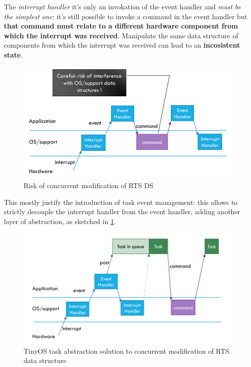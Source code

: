 \documentclass[10pt,a4paper]{report}
\theoremstyle{definition}
\begin{document}
The \textit{interrupt handler} it's only an invokation of the event handler and \textit{must be the simplest one}: it's still possible to invoke a command in the event handler but \textbf{that command must relate to a different hardware component from which the interrupt was received}. Manipulate the same data structure of components from which the interrupt was received can lead to an \textbf{incosistent state}.
\begin{figure}[h!]
	\centering\includegraphics[scale=0.50]{images/Pasted image 20230418120438.png}
	\caption{Risk of concurrent modification of RTS DS}

\end{figure}
This mostly justify the introduction of task event management: this allows to strictly decouple the interrupt handler from the event handler, adding another layer of abstraction, as sketched in \ref{tinyos-model-abstract3}.
\begin{figure}[h]
	\centering\includegraphics[scale=0.50]{images/Pasted image 20230418120543.png}
	\caption{TinyOS task abstraction solution to concurrent modification of RTS data structure}
	\label{tinyos-model-abstract3}
\end{figure}
\end{document}
